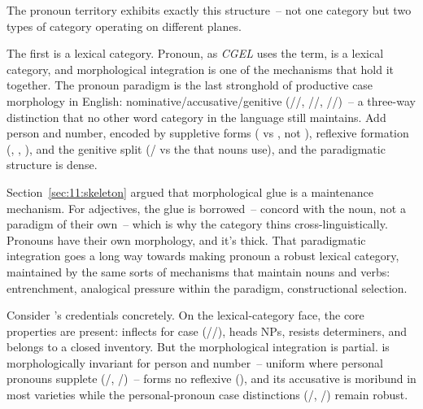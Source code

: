 The pronoun territory exhibits exactly this structure~-- not one category but two types of category operating on different planes.

The first is a lexical category. Pronoun, as \textit{CGEL} uses the term, is a lexical category, and morphological integration is one of the mechanisms that hold it together. The pronoun paradigm is the last stronghold of productive case morphology in English: nominative/accusative/genitive (//, //, //)~-- a three-way distinction that no other word category in the language still maintains. Add person and number, encoded by suppletive forms ( vs , not ), reflexive formation (, , ), and the genitive split (/ vs the  that nouns use), and the paradigmatic structure is dense.

Section~\ref{sec:11:skeleton} argued that morphological glue is a maintenance mechanism. For adjectives, the glue is borrowed~-- concord with the noun, not a paradigm of their own~-- which is why the category thins cross-linguistically. Pronouns have their own morphology, and it's thick. That paradigmatic integration goes a long way towards making pronoun a robust lexical category, maintained by the same sorts of mechanisms that maintain nouns and verbs: entrenchment, analogical pressure within the paradigm, constructional selection.

Consider 's credentials concretely. On the lexical-category face, the core properties are present:  inflects for case (//), heads NPs, resists determiners, and belongs to a closed inventory. But the morphological integration is partial.  is morphologically invariant for person and number~-- uniform where personal pronouns supplete (/, /)~-- forms no reflexive (), and its accusative  is moribund in most varieties while the personal-pronoun case distinctions (/, /) remain robust.

